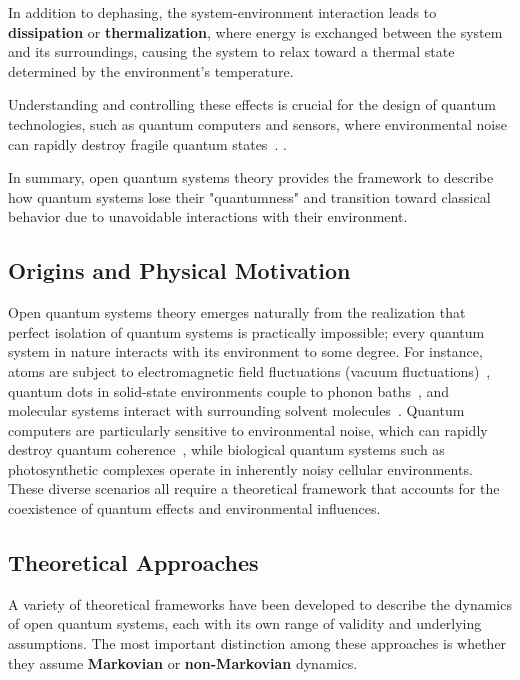 In addition to dephasing, the system-environment interaction leads to \textbf{dissipation} or \textbf{thermalization}, where energy is exchanged between the system and its surroundings, causing the system to relax toward a thermal state determined by the environment's temperature.

Understanding and controlling these effects is crucial for the design of quantum technologies, such as quantum computers and sensors, where environmental noise can rapidly destroy fragile quantum states~\cite{laddetal2010quantumcomputers}.  .

In summary, open quantum systems theory provides the framework to describe how quantum systems lose their "quantumness" and transition toward classical behavior due to unavoidable interactions with their environment.

\subsection{Origins and Physical Motivation}

Open quantum systems theory emerges naturally from the realization that perfect isolation of quantum systems is practically impossible; every quantum system in nature interacts with its environment to some degree. For instance, atoms are subject to electromagnetic field fluctuations (vacuum fluctuations)~\cite{breuerpetruccione2009theoryopenquantum}, quantum dots in solid-state environments couple to phonon baths~\cite{weiss2012quantumdissipativesystems}, and molecular systems interact with surrounding solvent molecules~\cite{mukamel1995principlesnonlinearoptical}. Quantum computers are particularly sensitive to environmental noise, which can rapidly destroy quantum coherence~\cite{laddetal2010quantumcomputers}, while biological quantum systems such as photosynthetic complexes operate in inherently noisy cellular environments.%
These diverse scenarios all require a theoretical framework that accounts for the coexistence of quantum effects and environmental influences.


\subsection{Theoretical Approaches}

A variety of theoretical frameworks have been developed to describe the dynamics of open quantum systems, each with its own range of validity and underlying assumptions. The most important distinction among these approaches is whether they assume \textbf{Markovian} or \textbf{non-Markovian} dynamics.

